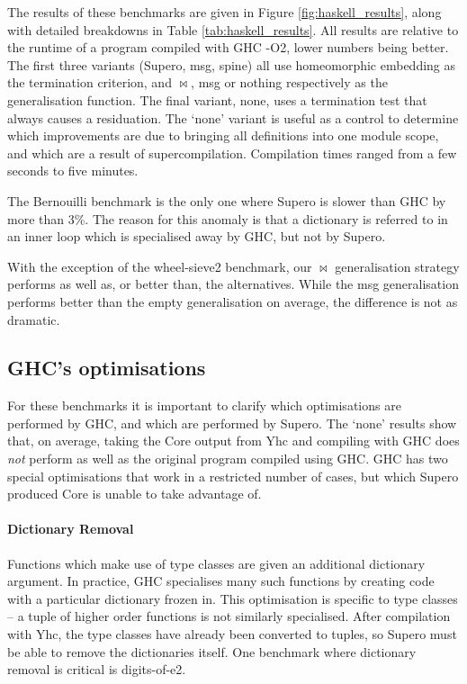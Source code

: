 The results of these benchmarks are given in Figure \ref{fig:haskell_results}, along with detailed breakdowns in Table \ref{tab:haskell_results}. All results are relative to the runtime of a program compiled with GHC -O2, lower numbers being better. The first three variants (Supero, msg, spine) all use homeomorphic embedding as the termination criterion, and $\bowtie$, msg or nothing respectively as the generalisation function. The final variant, none, uses a termination test that always causes a residuation. The `none' variant is useful as a control to determine which improvements are due to bringing all definitions into one module scope, and which are a result of supercompilation. Compilation times ranged from a few seconds to five minutes.

The Bernouilli benchmark is the only one where Supero is slower than GHC by more than 3\%. The reason for this anomaly is that a dictionary is referred to in an inner loop which is specialised away by GHC, but not by Supero.

With the exception of the wheel-sieve2 benchmark, our $\bowtie$ generalisation strategy performs as well as, or better than, the alternatives. While the msg generalisation performs better than the empty generalisation on average, the difference is not as dramatic.

\subsection{GHC's optimisations}

For these benchmarks it is important to clarify which optimisations are performed by GHC, and which are performed by Supero. The `none' results show that, on average, taking the Core output from Yhc and compiling with GHC does \textit{not} perform as well as the original program compiled using GHC. GHC has two special optimisations that work in a restricted number of cases, but which Supero produced Core is unable to take advantage of.

\paragraph{Dictionary Removal} Functions which make use of type classes are given an additional dictionary argument. In practice, GHC specialises many such functions by creating code with a particular dictionary frozen in. This optimisation is specific to type classes -- a tuple of higher order functions is not similarly specialised. After compilation with Yhc, the type classes have already been converted to tuples, so Supero must be able to remove the dictionaries itself. One benchmark where dictionary removal is critical is digits-of-e2.

